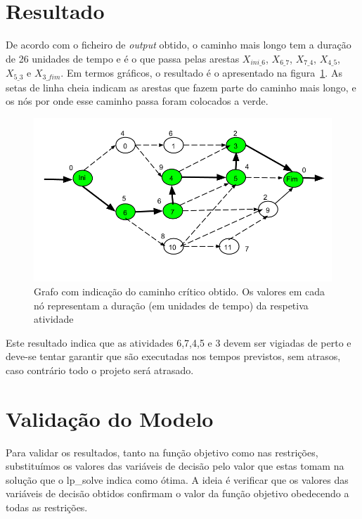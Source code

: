 \newpage

\section{Resultado}

De acordo com o ficheiro de \emph{output} obtido, o caminho mais longo tem
a duração de 26 unidades de tempo e é o que passa pelas arestas $X_{ini\_6}$,
$X_{6\_7}$, $X_{7\_4}$, $X_{4\_5}$, $X_{5\_3}$ e $X_{3\_fim}$. Em termos
gráficos, o resultado é o apresentado na figura~\ref{p1:fig:caminho_critico}. As
setas de linha cheia indicam as arestas que fazem parte do caminho mais longo,
e os nós por onde esse caminho passa foram colocados a verde.

\begin{figure}[<+htpb+>]
\centering
		  \includegraphics[scale=0.5]{./img/p1_caminho_critico}
\caption{Grafo com indicação do caminho crítico obtido. Os valores em cada nó
representam a duração (em unidades de tempo) da respetiva atividade}
\label{p1:fig:caminho_critico}
\end{figure}

Este resultado indica que as atividades 6,7,4,5 e 3 devem ser vigiadas de perto
e deve-se tentar garantir que são executadas nos tempos previstos, sem atrasos,
caso contrário todo o projeto será atrasado.

\section{Validação do Modelo}

Para validar os resultados, tanto na função objetivo como nas restrições,
substituímos os valores das variáveis de decisão pelo valor que estas tomam na
solução que o lp\_solve indica como ótima. A ideia é verificar que os valores
das variáveis de decisão obtidos confirmam o valor da função objetivo obedecendo
a todas as restrições.

